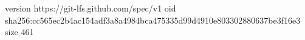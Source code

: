 version https://git-lfs.github.com/spec/v1
oid sha256:cc565ec2b4ac154adf3a8a4984bca475335d99d4910e803302880637be3f16e3
size 461
